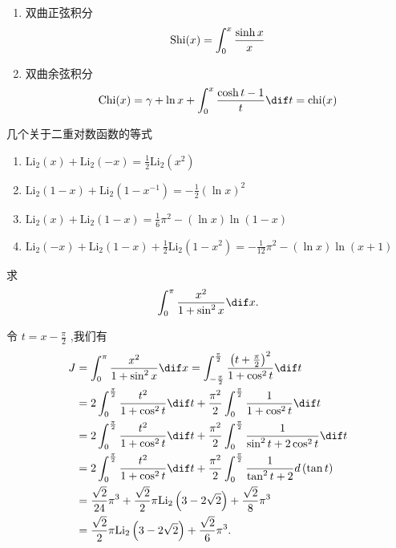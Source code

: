\documentclass[color=green,titlestyle=hang]{elegantbook}%
\begin{document}
\begin{newdef}[双曲积分函数]
\begin{enumerate}
	\item 双曲正弦积分\[{\rm Shi}(x)=\int_0^x\frac{\sinh x}{x}\]
	\item 双曲余弦积分\[{\rm Chi}(x)=\gamma+\ln x+\int_0^x\frac{\cosh t-1}{t}\dif t={\rm chi}(x)\]
\end{enumerate}	
\end{newdef}

\begin{newthem}几个关于二重对数函数的等式
\begin{enumerate}[label={(\arabic*)}]
\item $\textrm{Li}_{2}(x)+\textrm{Li}_{2}(-x)=\frac{1}{2}\textrm{Li}_{2}(x^2)$
\item $\textrm{Li}_{2}(1-x)+\textrm{Li}_{2}(1-x^{-1})=-\frac{1}{2}(\ln x)^2$
\item $\textrm{Li}_{2}(x)+\textrm{Li}_{2}(1-x)=\frac{1}{6}{\pi}^2-(\ln x)\ln(1-x)$
\item $\textrm{Li}_{2}(-x)+\textrm{Li}_{2}(1-x)+\frac{1}{2}\textrm{Li}_{2}(1-x^2)=-\frac{1}{12}{\pi}^2-(\ln x){\ln(x+1)}$			
\end{enumerate}	
\end{newthem}

\begin{exercise}
求\[\int_0^{\pi}{\frac{x^2}{1+\sin ^2x}\dif x}.\]
\end{exercise}\begin{Solution}
令 $t=x-\frac{\pi}{2}$ ,我们有
\begin{align*}J&=\int_0^{\pi}{\frac{x^2}{1+\sin ^2x}\dif x}=\int_{-\frac{\pi}{2}}^{\frac{\pi}{2}}{\frac{\left( t+\frac{\pi}{2} \right) ^2}{1+\cos ^2t}\dif t}\\&=2\int_0^{\frac{\pi}{2}}{\frac{t^2}{1+\cos ^2t}\dif t}+\frac{\pi ^2}{2}\int_0^{\frac{\pi}{2}}{\frac{1}{1+\cos ^2t}\dif t}\\&=2\int_0^{\frac{\pi}{2}}{\frac{t^2}{1+\cos ^2t}\dif t}+\frac{\pi ^2}{2}\int_0^{\frac{\pi}{2}}{\frac{1}{\sin ^2t+2\cos ^2t}\dif t}\\&=2\int_0^{\frac{\pi}{2}}{\frac{t^2}{1+\cos ^2t}\dif t}+\frac{\pi ^2}{2}\int_0^{\frac{\pi}{2}}{\frac{1}{\tan ^2t+2}d\left( \tan t \right)}\\&=\frac{\sqrt{2}}{24}\pi ^3+\frac{\sqrt{2}}{2}\pi \mathrm{Li}_2\left( 3-2\sqrt{2} \right) +\frac{\sqrt{2}}{8}\pi ^3\\&=\frac{\sqrt{2}}{2}\pi \mathrm{Li}_2\left( 3-2\sqrt{2} \right) +\frac{\sqrt{2}}{6}\pi ^3.\end{align*}
\end{Solution}
\end{document}
